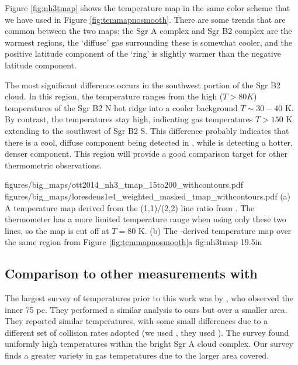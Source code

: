 Figure \ref{fig:nh3tmap} shows the \citet{Ott2014a} temperature map in the same
color scheme that we have used in Figure \ref{fig:temmapnosmooth}.  There are some
trends that are common between the two maps: the Sgr A complex and Sgr B2
complex are the warmest regions, the `diffuse' gas surrounding these is
somewhat cooler, and the positive latitude component of the
\citet{Molinari2011a} `ring' is slightly warmer than the negative latitude
component.

The most significant difference occurs in the southwest portion of the Sgr B2
cloud.  In this region, the \ammonia temperature ranges from the high ($T>80K$)
temperatures of the Sgr B2 N hot ridge into a cooler background $T\sim30-40$ K.
By contrast, the \formaldehyde temperatures stay high, indicating gas
temperatures $T>150$ K extending to the southwest of Sgr B2 S.  This difference
probably indicates that there is a cool, diffuse component being detected in
\ammonia, while \formaldehyde is detecting a hotter, denser component.  This
region will provide a good comparison target for other thermometric
observations.

\RotFigureTwoAA
{figures/big_maps/ott2014_nh3_tmap_15to200_withcontours.pdf}
{figures/big_maps/loresdens1e4_weighted_masked_tmap_withcontours.pdf}
{(a) A temperature map derived from the \ammonia (1,1)/(2,2) line ratio from
\citet{Ott2014a}.  The \ammonia thermometer has a more limited temperature
range when using only these two lines, so the map is cut off at $T=80$ K.
(b) The \para-derived temperature map over the same region from Figure
\ref{fig:temmapnosmooth}a
}
{fig:nh3tmap}
{1}{9.5in}

\subsection{Comparison to other measurements with \para}
\label{sec:h2cocompare}
The largest survey of \para temperatures prior to this work was by
\citet{Ao2013a}, who observed the inner 75 pc.  They performed a similar
analysis to ours but over a smaller area.  They reported similar temperatures,
with some small differences due to a different set of collision rates adopted
(we used \citet{Wiesenfeld2013a}, they used \citet{Green1991a}).  The \citet{Ao2013a}
survey found uniformly high temperatures within the bright Sgr A cloud complex.
Our survey finds a greater variety in gas temperatures due to the larger area
covered.

